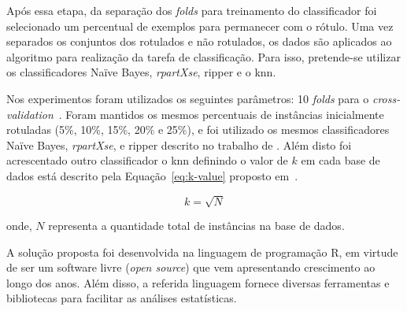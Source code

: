     Após essa etapa, da separação dos \textit{folds} para treinamento do classificador foi selecionado um percentual de exemplos para permanecer com o rótulo. Uma vez separados os conjuntos dos rotulados e não rotulados, os dados são aplicados ao algoritmo para realização da tarefa de classificação. Para isso, pretende\hyp{se} utilizar os classificadores Naïve Bayes, \textit{rpartXse}, \ac{ripper} e o \ac{knn}.
    
    Nos experimentos foram utilizados os seguintes parâmetros: 10 \textit{folds} para o \textit{cross\hyp{validation}}~\cite{kohavi1995study, braga2004cross, fushiki2011cross, wong2015cross}. Foram mantidos os mesmos percentuais de instâncias inicialmente rotuladas (5\%, 10\%, 15\%, 20\% e 25\%), e foi utilizado os mesmos classificadores Na\"ive Bayes, \textit{rpartXse}, e \ac{ripper} descrito no trabalho de \cite{vale2018selftraining}. Além disto foi acrescentado outro classificador o \ac{knn} definindo o valor de $k$ em cada base de dados está descrito pela Equação~\ref{eq:k-value} proposto em~\cite{bhattacharya2012knnvalue}.
    
    \begin{equation}
        \label{eq:k-value}
        k = \sqrt{N}
    \end{equation}
    
    \noindent
    onde, $N$ representa a quantidade total de instâncias na base de dados.

    A solução proposta foi desenvolvida na linguagem de programação R, em virtude de ser um software livre (\textit{open source}) que vem apresentando crescimento ao longo dos anos. Além disso, a referida linguagem fornece diversas ferramentas e bibliotecas para facilitar as análises estatísticas.
    